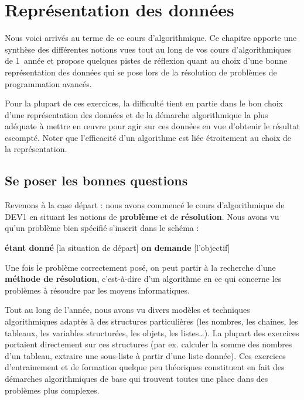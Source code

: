 \chapter{Représentation des données}

	Nous voici arrivés au terme de ce cours d'algorithmique. 
	Ce chapitre apporte une synthèse des différentes notions vues 
	tout au long de vos cours d'algorithmiques de 1\iere\ année 
	et propose quelques pistes de réflexion 
	quant au choix d’une bonne représentation des données 
	qui se pose lors de la résolution de problèmes de programmation avancés.
	
	Pour la plupart de ces exercices,
	la difficulté tient en partie dans le bon choix d’une représentation des données 
	et de la démarche algorithmique la plus adéquate à mettre en \oe{}uvre 
	pour agir sur ces données en vue d’obtenir le résultat escompté. 
	Noter que l’efficacité d’un algorithme 
	est liée étroitement au choix de la représentation.

\section{Se poser les bonnes questions}

	Revenons à la case départ : 
	nous avons commencé le cours d'algorithmique de DEV1
	en situant les notions de \textbf{problème} et de \textbf{résolution}. 
	Nous avons vu qu’un problème bien spécifié s’inscrit dans le schéma :
	
		\begin{center}
		\begin{Ovalbox}
			{\textbf{étant donné} [la situation de départ] 
			\textbf{on demande} [l’objectif]}
		\end{Ovalbox}
		\end{center}
	
	Une fois le problème correctement posé, 
	on peut partir à la recherche d’une \textbf{méthode de résolution}, 
	c’est-à-dire d’un algorithme en ce qui concerne les problèmes 
	à résoudre par les moyens informatiques.
	
	Tout au long de l’année, 
	nous avons vu divers modèles et techniques algorithmiques adaptés 
	à des structures particulières 
	(les nombres, les chaines, les tableaux, les variables structurées, 
	les objets, les listes\dots). 
	La plupart des exercices portaient directement sur ces structures 
	(par ex. calculer la somme des nombres d’un tableau,
	extraire une sous-liste à partir d’une liste donnée). 
	Ces exercices d’entrainement et de formation quelque peu théoriques 
	constituent en fait des démarches algorithmiques de base 
	qui trouvent toutes une place dans des problèmes plus complexes.
	
